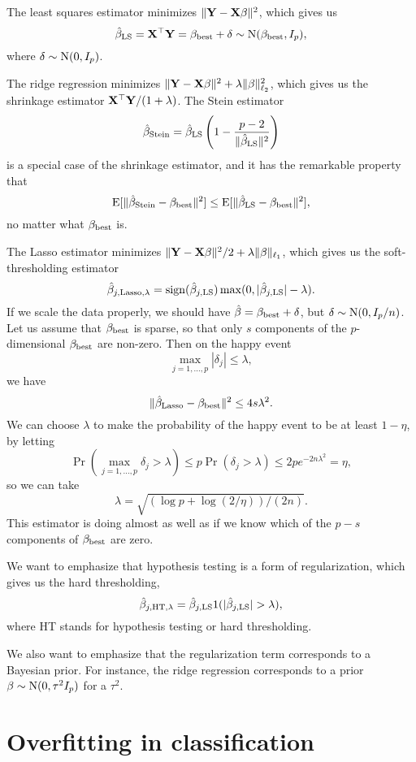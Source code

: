 \documentclass[11pt]{article}
\newcommand{\E}{\mathbb{E}}
\def\T{{\top}}
\def\E{{\rm E}}
\def\T{{\top}}
\def\X{{\bf X}}
\def\Y{{\bf Y}}
\begin{document}
The least squares estimator minimizes $\|\Y - \X \beta\|^2$, which gives us 
\[
\hat{\beta}_{\rm LS} = \X^\T \Y  = \beta_{\rm best} + \delta \sim {\rm N}(\beta_{\rm best}, I_p),
\] 
where $\delta \sim {\rm N}(0, I_p)$. 

The ridge regression minimizes $\|\Y - \X\beta\|^2 + \lambda \|\beta\|_{\ell_2}^2$, which gives us the shrinkage estimator $\X^\T \Y /(1+\lambda)$. The Stein estimator 
\[
     \hat{\beta}_{\rm Stein} = \hat{\beta}_{\rm LS}  \left(1 - \frac{p-2}{\|\hat{\beta}_{\rm LS}\|^2}\right)
 \]
is a special case of the shrinkage estimator, and it has the remarkable property that 
\[
\E[\|\hat{\beta}_{\rm Stein} - \beta_{\rm best}\|^2] \leq \E[\|\hat{\beta}_{\rm LS} - \beta_{\rm best}\|^2], 
\]
no matter what $\beta_{\rm best}$ is.  

The Lasso estimator minimizes $\|\Y - \X\beta\|^2/2 + \lambda \|\beta\|_{\ell_1}$, which gives us the soft-thresholding estimator 
 \[
 \hat{\beta}_{j, {\rm Lasso}, \lambda} = {\rm sign}(\hat{\beta}_{j, {\rm LS}}) \max(0, |\hat{\beta}_{j, {\rm LS}}| - \lambda).
 \]
If we scale the data properly, we should have $\hat{\beta} = \beta_{\rm best} + \delta$, but $\delta \sim {\rm N}(0, I_p/n)$. Let us assume that $\beta_{\rm best}$ is sparse, so that only $s$ components of the $p$-dimensional $\beta_{\rm best}$ are non-zero. Then on the happy event
\[
     \max_{j = 1, ..., p} |\delta_j| \leq \lambda, 
 \]
  we have 
  \[
     \|\hat{\beta}_{\rm Lasso} - \beta_{\rm best}\|^2 \leq 4 s \lambda^2.
  \]
 We can choose $\lambda$ to make the probability of the happy event to be at least $1- \eta$, by letting 
 \[
    \Pr(\max_{j=1,...,p} \delta_j > \lambda) \leq p \Pr(\delta_j > \lambda) \leq 2p e^{-2n \lambda^2} = \eta, 
 \]
 so we can take 
 \[
    \lambda = \sqrt{(\log p + \log (2/\eta))/(2n)}. 
 \]
This estimator is doing almost as well as if we know which of the $p-s$ components of $\beta_{\rm best}$ are zero. 

We want to emphasize that hypothesis testing is a form of regularization, which gives us the hard thresholding, 
 \[
 \hat{\beta}_{j, {\rm HT}, \lambda} = \hat{\beta}_{j, {\rm LS}} 1(|\hat{\beta}_{j, {\rm LS}}| > \lambda), 
 \]
 where HT stands for hypothesis testing or hard thresholding. 
 
 We also want to emphasize that the regularization term corresponds to a Bayesian prior. For instance, the ridge regression corresponds to a prior $\beta \sim {\rm N}(0, \tau^2 I_p)$ for a $\tau^2$. 

\section{Overfitting in classification}
\end{document}
